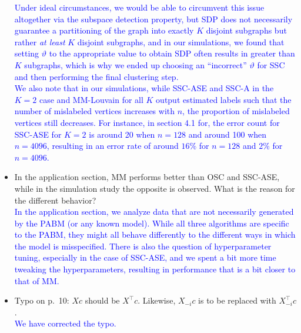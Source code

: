 \documentclass[
]{article}
\begin{document}
\begin{itemize}
  \textcolor{blue}{
  Under ideal circumstances, we would be able to circumvent this issue altogether via the subspace detection property, but SDP does not necessarily guarantee a partitioning of the graph into exactly $K$ disjoint subgraphs but rather {\em at least} $K$ disjoint subgraphs, and in our simulations, we found that setting $\vartheta$ to the appropriate value to obtain SDP often results in greater than $K$ subgraphs, which is why we ended up choosing an ``incorrect'' $\vartheta$ for SSC and then performing the final clustering step.
  }\\
  \textcolor{blue}{
  We also note that in our simulations, while SSC-ASE and SSC-A in the $K = 2$ case and MM-Louvain for all $K$ output estimated labels such that the number of mislabeled vertices increases with $n$, the proportion of mislabeled vertices still decreases. 
  For instance, in section 4.1 for, the error count for SSC-ASE for $K = 2$ is around 20 when $n = 128$ and around 100 when $n = 4096$, resulting in an error rate of around $16\%$ for $n = 128$ and $2\%$ for $n = 4096$. 
  }
\item
  In the application section, MM performs better than OSC and SSC-ASE,
  while in the simulation study the opposite is observed. What is the
  reason for the different behavior?\\
  \textcolor{blue}{
  In the application section, we analyze data that are not necessarily generated by the PABM (or any known model). 
  While all three algorithms are specific to the PABM, they might all behave differently to the different ways in which the model is misspecified. 
  There is also the question of hyperparameter tuning, especially in the case of SSC-ASE, and we spent a bit more time tweaking the hyperparameters, resulting in performance that is a bit closer to that of MM. 
  }
\item
  Typo on p.~10: \(X c\) should be \(X^\top c\). Likewise, \(X_{-i} c\)
  is to be replaced with \(X_{-i}^\top c\).\\
  \textcolor{blue}{
  We have corrected the typo.
  }
\end{itemize}

\newpage

  
\end{document}
